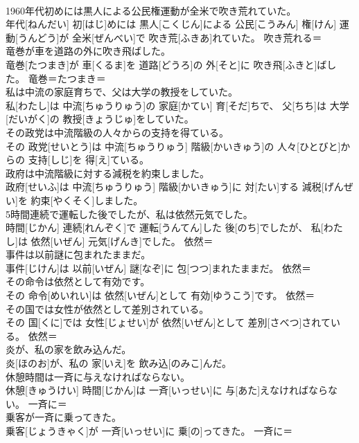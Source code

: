 \documentclass[8pt]{extreport}
\begin{document}
\begin{CJK}{UTF8}{min}
\\	1960年代初めには黒人による公民権運動が全米で吹き荒れていた。	
\\	年代[ねんだい] 初[はじ]めには 黒人[こくじん]による 公民[こうみん] 権[けん] 運動[うんどう]が 全米[ぜんべい]で 吹き荒[ふきあ]れていた。	吹き荒れる＝ 
\\	竜巻が車を道路の外に吹き飛ばした。	
\\	竜巻[たつまき]が 車[くるま]を 道路[どうろ]の 外[そと]に 吹き飛[ふきと]ばした。	竜巻＝たつまき＝ 
\\	私は中流の家庭育ちで、父は大学の教授をしていた。	
\\	私[わたし]は 中流[ちゅうりゅう]の 家庭[かてい] 育[そだ]ちで、 父[ちち]は 大学[だいがく]の 教授[きょうじゅ]をしていた。	
\\	その政党は中流階級の人々からの支持を得ている。	
\\	その 政党[せいとう]は 中流[ちゅうりゅう] 階級[かいきゅう]の 人々[ひとびと]からの 支持[しじ]を 得[え]ている。	
\\	政府は中流階級に対する減税を約束しました。	
\\	政府[せいふ]は 中流[ちゅうりゅう] 階級[かいきゅう]に 対[たい]する 減税[げんぜい]を 約束[やくそく]しました。	
\\	5時間連続で運転した後でしたが、私は依然元気でした。	
\\	時間[じかん] 連続[れんぞく]で 運転[うんてん]した 後[のち]でしたが、 私[わたし]は 依然[いぜん] 元気[げんき]でした。	依然＝ 
\\	事件は以前謎に包まれたままだ。	
\\	事件[じけん]は 以前[いぜん] 謎[なぞ]に 包[つつ]まれたままだ。	依然＝ 
\\	その命令は依然として有効です。	
\\	その 命令[めいれい]は 依然[いぜん]として 有効[ゆうこう]です。	依然＝ 
\\	その国では女性が依然として差別されている。	
\\	その 国[くに]では 女性[じょせい]が 依然[いぜん]として 差別[さべつ]されている。	依然＝ 
\\	炎が、私の家を飲み込んだ。	
\\	炎[ほのお]が、私の 家[いえ]を 飲み込[のみこ]んだ。	
\\	休憩時間は一斉に与えなければならない。	
\\	休憩[きゅうけい] 時間[じかん]は 一斉[いっせい]に 与[あた]えなければならない。	一斉に＝ 
\\	乗客が一斉に乗ってきた。	
\\	乗客[じょうきゃく]が 一斉[いっせい]に 乗[の]ってきた。	一斉に＝ 

\end{CJK}
\end{document}

